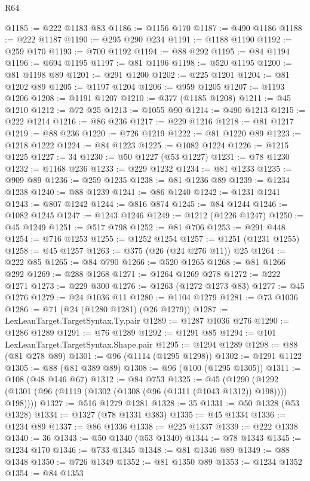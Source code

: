 \begin{lexlean}{R64}
\begin{coremodule}
@1185 := @222 @1183 @83
@1186 := @1156 @170
@1187 := @490 @1186
@1188 := @222 @1187
@1190 := @295 @290 @234
@1191 := @1188 @1190
@1192 := @259 @170
@1193 := @700 @1192
@1194 := @88 @292
@1195 := @84 @1194
@1196 := @694 @1195
@1197 := @81 @1196
@1198 := @520 @1195
@1200 := @81 @1198 @89
@1201 := @291 @1200
@1202 := @225 @1201
@1204 := @81 @1202 @89
@1205 := @1197 @1204
@1206 := @959 @1205
@1207 := @1193 @1206
@1208 := @1191 @1207
@1210 := @377 (@1185 @1208)
@1211 := @45 @1210
@1212 := @72 @25
@1213 := @1055 @90
@1214 := @490 @1213
@1215 := @222 @1214
@1216 := @86 @236
@1217 := @229 @1216
@1218 := @81 @1217
@1219 := @88 @236
@1220 := @726 @1219
@1222 := @81 @1220 @89
@1223 := @1218 @1222
@1224 := @84 @1223
@1225 := @1082 @1224
@1226 := @1215 @1225
@1227 := 34
@1230 := @50 @1227 (@53 @1227)
@1231 := @78 @1230
@1232 := @1168 @236
@1233 := @229 @1232
@1234 := @81 @1233
@1235 := @909 @89
@1236 := @259 @1235
@1238 := @81 @1236 @89
@1239 := @1234 @1238
@1240 := @88 @1239
@1241 := @86 @1240
@1242 := @1231 @1241
@1243 := @807 @1242
@1244 := @816 @874
@1245 := @84 @1244
@1246 := @1082 @1245
@1247 := @1243 @1246
@1249 := @1212 (@1226 @1247)
@1250 := @45 @1249
@1251 := @517 @798
@1252 := @81 @706
@1253 := @291 @448
@1254 := @716 @1253
@1255 := @1252 @1254
@1257 := @1251 (@1231 @1255)
@1258 := @45 @1257
@1263 := @375 (@26 (@24 @276 @11)) @25
@1264 := @222 @85
@1265 := @84 @790
@1266 := @520 @1265
@1268 := @81 @1266 @292
@1269 := @288 @1268
@1271 := @1264 @1269 @278
@1272 := @222 @1271
@1273 := @229 @300
@1276 := @1263 (@1272 @1273 @83)
@1277 := @45 @1276
@1279 := @24 @1036 @11
@1280 := @1104 @1279
@1281 := @73 @1036
@1286 := @71 (@24 (@1280 @1281) (@26 @1279))
@1287 := LexLeanTarget.TargetSyntax.Ty.pair
@1289 := @1287 @1036 @276
@1290 := @1286 @1289
@1291 := @76 @1289
@1292 := @1291 @85
@1294 := @101 LexLeanTarget.TargetSyntax.Shape.pair
@1295 := @1294 @1289
@1298 := @88 (@81 @278 @89)
@1301 := @96 (@1114 (@1295 @1298))
@1302 := @1291 @1122
@1305 := @88 (@81 @389 @89)
@1308 := @96 (@100 (@1295 @1305))
@1311 := @108 (@48 @146 @67)
@1312 := @84 @753
@1325 := @45
    (@1290 (@1292 (@1301 (@96 (@1119 (@1302 (@1308 (@96 (@1311 (@1043 @1312)) @198)))) @198))))
@1327 := @516 @1279 @1281
@1328 := 35
@1331 := @50 @1328 (@53 @1328)
@1334 := @1327 (@78 @1331 @383)
@1335 := @45 @1334
@1336 := @1234 @89
@1337 := @86 @1336
@1338 := @225 @1337
@1339 := @222 @1338
@1340 := 36
@1343 := @50 @1340 (@53 @1340)
@1344 := @78 @1343
@1345 := @1234 @170
@1346 := @733 @1345
@1348 := @81 @1346 @89
@1349 := @88 @1348
@1350 := @726 @1349
@1352 := @81 @1350 @89
@1353 := @1234 @1352
@1354 := @84 @1353

\end{coremodule}
\end{lexlean}
